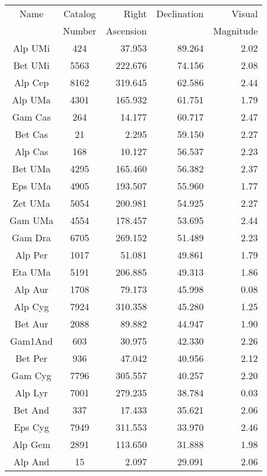 \begin{tabular}{ccrrr} \hline
Name & Catalog &   Right  &  Declination &  Visual \\
 & Number &  Ascension  &   &  Magnitude \\ \hline
Alp UMi &     424 &   37.953 &   89.264 &   2.02 \\ 
Bet UMi &    5563 &  222.676 &   74.156 &   2.08 \\ 
Alp Cep &    8162 &  319.645 &   62.586 &   2.44 \\ 
Alp UMa &    4301 &  165.932 &   61.751 &   1.79 \\ 
Gam Cas &     264 &   14.177 &   60.717 &   2.47 \\ 
Bet Cas &      21 &    2.295 &   59.150 &   2.27 \\ 
Alp Cas &     168 &   10.127 &   56.537 &   2.23 \\ 
Bet UMa &    4295 &  165.460 &   56.382 &   2.37 \\ 
Eps UMa &    4905 &  193.507 &   55.960 &   1.77 \\ 
Zet UMa &    5054 &  200.981 &   54.925 &   2.27 \\ 
Gam UMa &    4554 &  178.457 &   53.695 &   2.44 \\ 
Gam Dra &    6705 &  269.152 &   51.489 &   2.23 \\ 
Alp Per &    1017 &   51.081 &   49.861 &   1.79 \\ 
Eta UMa &    5191 &  206.885 &   49.313 &   1.86 \\ 
\rowcolor[gray]{0.8}  Alp Aur &    1708 &   79.173 &   45.998 &   0.08 \\ 
Alp Cyg &    7924 &  310.358 &   45.280 &   1.25 \\ 
Bet Aur &    2088 &   89.882 &   44.947 &   1.90 \\ 
Gam1And &     603 &   30.975 &   42.330 &   2.26 \\ 
Bet Per &     936 &   47.042 &   40.956 &   2.12 \\ 
Gam Cyg &    7796 &  305.557 &   40.257 &   2.20 \\ 
\rowcolor[gray]{0.8}  Alp Lyr &    7001 &  279.235 &   38.784 &   0.03 \\ 
Bet And &     337 &   17.433 &   35.621 &   2.06 \\ 
Eps Cyg &    7949 &  311.553 &   33.970 &   2.46 \\ 
Alp Gem &    2891 &  113.650 &   31.888 &   1.98 \\ 
Alp And &      15 &    2.097 &   29.091 &   2.06 \\ 

\end{tabular}
